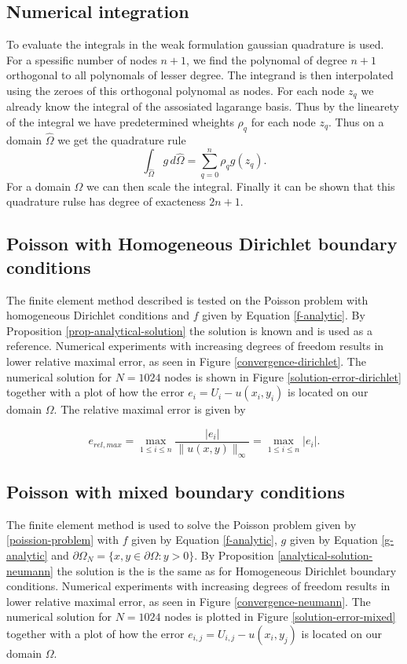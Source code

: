 \documentclass[5pt,a4paper,english]{elsarticle}%
\begin{document}
\subsection{Numerical integration}
To evaluate the integrals in the weak formulation gaussian quadrature is used. For a spessific number of nodes $n+1$, we find the polynomal of degree $n+1$ orthogonal to all polynomals of lesser degree. The integrand is then interpolated using the zeroes of this orthogonal polynomal as nodes. For each node $z_q$ we already know the integral of the assosiated lagarange basis. Thus by the linearety of the integral we have predetermined wheights $\rho_q$  for each node $z_q$. Thus on a domain $\hat{\Omega}$ we get the quadrature rule
\begin{equation}
    \int_{\hat{\Omega}} g \, d\hat{\Omega} = \sum_{q=0}^{n}{\rho_q g(z_q)}.
\end{equation}
For a domain $\Omega$ we can then scale the integral. Finally it can be shown that this quadrature rulse has degree of exacteness $2n+1$.


\subsection{Poisson with Homogeneous Dirichlet boundary conditions}
The finite element method described is tested on the Poisson problem with homogeneous Dirichlet conditions and $f$ given by Equation \eqref{f-analytic}. 
By Proposition \ref{prop-analytical-solution} the solution is known and is used as a reference. 
Numerical experiments with increasing degrees of freedom results in lower relative maximal error, as seen in Figure \ref{convergence-dirichlet}. The numerical solution for $N = 1024$ nodes is shown in Figure \ref{solution-error-dirichlet}
together with a plot of how the error $e_{i} = U_{i} - u(x_i,y_i)$ is located on our domain $\Omega$. 
The relative maximal error is given by

\begin{equation*}
    e_{rel,max} = \max_{1\leq i \leq n} \frac{|e_i|}{\| u(x,y)\|_{\infty}} = \max_{1\leq i \leq n} |e_i|.
\end{equation*}

\subsection{Poisson with mixed boundary conditions}
The finite element method is used to solve the Poisson problem given by \eqref{poission-problem} with $f$ given by Equation \eqref{f-analytic}, $g$ given by Equation \eqref{g-analytic} and $\partial \Omega_N = \{ x,y \in \partial \Omega : y> 0\}$. By Proposition \ref{analytical-solution-neumann} the solution is the is the same as for Homogeneous Dirichlet boundary conditions. Numerical experiments with increasing degrees of freedom results in lower relative maximal error, as seen in Figure \ref{convergence-neumann}. The numerical solution for $N = 1024$ nodes is plotted in Figure \ref{solution-error-mixed} together with a plot of how the error $e_{i,j} = U_{i,j} - u(x_i,y_j)$ is located on our domain $\Omega$. 
\end{document}
